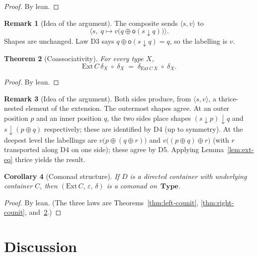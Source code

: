 \documentclass[11pt,a4paper]{article}
\theoremstyle{plain}
\newtheorem{theorem}{Theorem}[section]
\newtheorem{corollary}[theorem]{Corollary}
\theoremstyle{definition}
\newtheorem{remark}[theorem]{Remark}
\newcommand{\Ext}{\mathrm{Ext}}
\newcommand{\Type}{\mathbf{Type}}
\newcommand{\rootpos}{\mathsf{o}}
\newcommand{\sub}{\mathbin{\downarrow}}
\newcommand{\shift}{\oplus}
\begin{document}
\begin{proof}
By lean.
\end{proof}

\begin{remark}[Idea of the argument]
The composite sends $\langle s,v\rangle$ to
\[
  \bigl\langle s,\;
    q\mapsto v\bigl(q\shift\rootpos(s\sub q)\bigr)
  \bigr\rangle.
\]
Shapes are unchanged. Law D3 says $q\shift\rootpos(s\sub q)=q$, so the
labelling is $v$.
\end{remark}

\begin{theorem}[Coassociativity]\label{thm:coassoc}
For every type $X$,
\begin{equation}
  \Ext\,C\,\delta_X\;\circ\;\delta_X
  \;=\;
  \delta_{\Ext\,C\,X}\;\circ\;\delta_X.
\end{equation}
\end{theorem}

\begin{proof}
By lean.
\end{proof}

\begin{remark}[Idea of the argument]
Both sides produce, from $\langle s,v\rangle$, a thrice-nested element of
the extension. The outermost shapes agree. At an outer position $p$ and an
inner position $q$, the two sides place shapes
$(s\sub p)\sub q$ and $s\sub(p\shift q)$ respectively; these are identified
by D4 (up to symmetry). At the deepest level the labellings are
$v\bigl(p\shift(q\shift r)\bigr)$ and
$v\bigl((p\shift q)\shift r\bigr)$ (with $r$ transported along D4 on one
side); these agree by D5. Applying Lemma~\ref{lem:ext-eq} thrice yields the
result.
\end{remark}

\begin{corollary}[Comonad structure]\label{cor:comonad}
If $D$ is a directed container with underlying container $C$, then
$(\Ext\,C,\,\varepsilon,\,\delta)$ is a comonad on~$\Type$.
\end{corollary}

\begin{proof}
By lean. (The three laws are Theorems~\ref{thm:left-counit},
\ref{thm:right-counit}, and~\ref{thm:coassoc}.)
\end{proof}

\section{Discussion}
\end{document}
